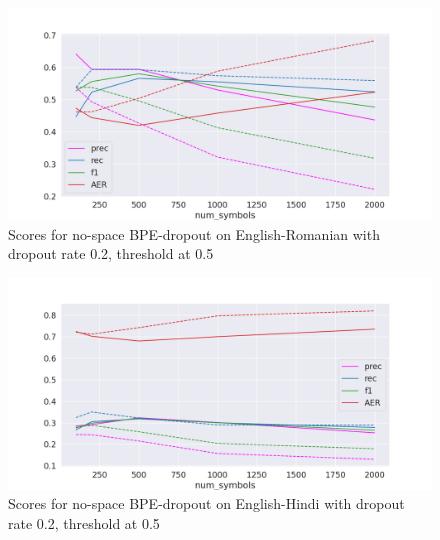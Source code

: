 \begin{figure}[!ht]
    \centering
    \includegraphics[width=13cm]{../reports/scores_dropout_bpe/no space/0.2/eng_ron_ns_0.5_thres_fastalign.png}
    \caption{Scores for no-space BPE-dropout on English-Romanian with dropout rate 0.2, threshold at 0.5}
\end{figure}

\begin{figure}[!ht]
    \centering
    \includegraphics[width=13cm]{../reports/scores_dropout_bpe/no space/0.2/eng_hin_ns_0.5_thres_fastalign.png}
    \caption{Scores for no-space BPE-dropout on English-Hindi with dropout rate 0.2, threshold at 0.5}
\end{figure}